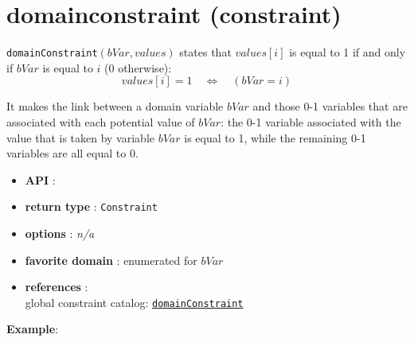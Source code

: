 \label{domainconstraint}
\hypertarget{domainconstraint}{}

\section{domainconstraint (constraint)}\label{domainconstraint:domainconstraintconstraint}\hypertarget{domainconstraint:domainconstraintconstraint}{}
\begin{notedef}  
\texttt{domainConstraint}$(bVar,values)$ states that $values[i]$ is equal to 1 if and only if $bVar$ is equal to $i$ (0 otherwise):
$$values[i]=1\quad\iff\quad (bVar=i)$$ 
\end{notedef}

It makes the link between a domain variable $bVar$ and those 0-1 variables that are associated with each potential value of $bVar$: the 0-1 variable associated with the value that is taken by variable $bVar$ is equal to 1, while the remaining 0-1 variables are all equal to 0.

\begin{itemize}
	\item \textbf{API} : 
	\item \textbf{return type} : \texttt{Constraint}
	\item \textbf{options} : \emph{n/a}
	\item \textbf{favorite domain} : enumerated for $bVar$
	\item \textbf{references} :\\
	  global constraint catalog: \href{http://www.emn.fr/x-info/sdemasse/gccat/Cdomain_constraint.html}{\tt domainConstraint}
\end{itemize}

\textbf{Example}:

